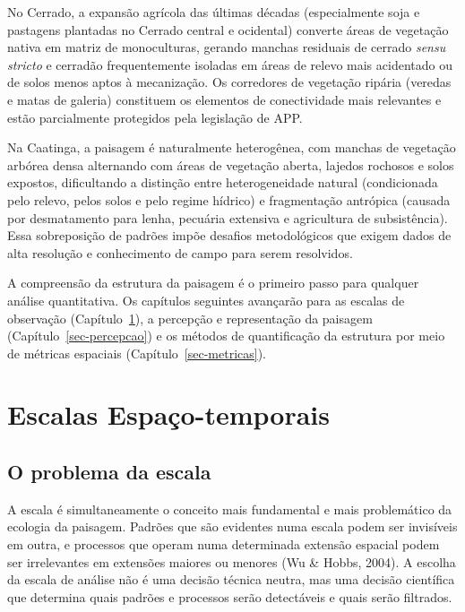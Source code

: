 \documentclass[
  portuguese,
  11pt,
  a4paper,
  open=any]{scrbook}
\begin{document}
No Cerrado, a expansão agrícola das últimas décadas (especialmente soja
e pastagens plantadas no Cerrado central e ocidental) converte áreas de
vegetação nativa em matriz de monoculturas, gerando manchas residuais de
cerrado \emph{sensu stricto} e cerradão frequentemente isoladas em áreas
de relevo mais acidentado ou de solos menos aptos à mecanização. Os
corredores de vegetação ripária (veredas e matas de galeria) constituem
os elementos de conectividade mais relevantes e estão parcialmente
protegidos pela legislação de APP.

Na Caatinga, a paisagem é naturalmente heterogênea, com manchas de
vegetação arbórea densa alternando com áreas de vegetação aberta,
lajedos rochosos e solos expostos, dificultando a distinção entre
heterogeneidade natural (condicionada pelo relevo, pelos solos e pelo
regime hídrico) e fragmentação antrópica (causada por desmatamento para
lenha, pecuária extensiva e agricultura de subsistência). Essa
sobreposição de padrões impõe desafios metodológicos que exigem dados de
alta resolução e conhecimento de campo para serem resolvidos.

A compreensão da estrutura da paisagem é o primeiro passo para qualquer
análise quantitativa. Os capítulos seguintes avançarão para as escalas
de observação (Capítulo~\ref{sec-escalas}), a percepção e representação
da paisagem (Capítulo~\ref{sec-percepcao}) e os métodos de quantificação
da estrutura por meio de métricas espaciais
(Capítulo~\ref{sec-metricas}).

\chapter{Escalas Espaço-temporais}\label{sec-escalas}

\section{O problema da escala}\label{o-problema-da-escala}

A escala é simultaneamente o conceito mais fundamental e mais
problemático da ecologia da paisagem. Padrões que são evidentes numa
escala podem ser invisíveis em outra, e processos que operam numa
determinada extensão espacial podem ser irrelevantes em extensões
maiores ou menores (Wu \& Hobbs, 2004). A escolha da escala de análise
não é uma decisão técnica neutra, mas uma decisão científica que
determina quais padrões e processos serão detectáveis e quais serão
filtrados.
\end{document}
